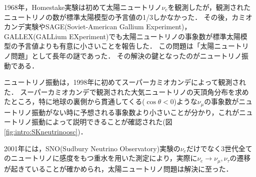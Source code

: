 \documentclass[../../main.tex]{subfiles}
\begin{document}
1968年，Homestake実験は初めて太陽ニュートリノ$\nu_{e}$を観測したが，観測されたニュートリノの数が標準太陽模型の予言値の1/3しかなかった\cite{intro:Homestake}．
その後，カミオカンデ実験やSAGE(Soviet-American Gallium Experiment)，GALLEX(GALLium EXperiment)でも太陽ニュートリノの事象数が標準太陽模型の予言値よりも有意に小さいことを報告した\cite{intro:kamiokande}\cite{intro:SAGE}\cite{intro:GALLEX}．
この問題は「太陽ニュートリノ問題」として長年の謎であった．
その解決の鍵となったのがニュートリノ振動である．

ニュートリノ振動は，1998年に初めてスーパーカミオカンデによって観測された\cite{intro:SKneuosi}．
スーパーカミオカンデで観測された大気ニュートリノの天頂角分布を求めたところ，特に地球の裏側から貫通してくる($\cos\theta<0$)ような$\nu_{\mu}$の事象数がニュートリノ振動がない時に予想される事象数より小さいことが分かり，これがニュートリノ振動によって説明できることが確認された(図\ref{fig:intro:SKneutrinoosc})．

2001年には，SNO(Sudbury Neutrino Observatory)実験の$\nu_e$だけでなく3世代全てのニュートリノに感度をもつ重水を用いた測定により，実際に$\nu_{e}\rightarrow\nu_{\mu},\nu_{\tau}$の遷移が起きていることが確かめられ，太陽ニュートリノ問題は解決に至った\cite{intro:SNO}．
\end{document}
